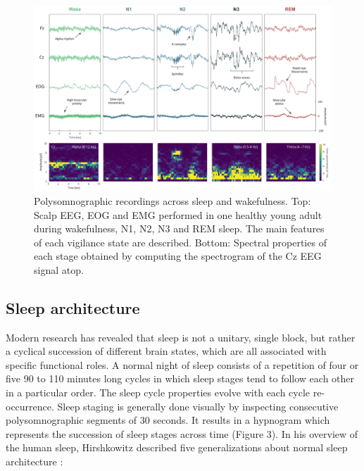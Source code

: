 \begin{figure}
	\centering
	\includegraphics[width=\linewidth, height=0.8\textheight, keepaspectratio]{Fig/Intro/Intro_Sleep_Stages_PSD/Fig_Intro_Sleep_Stages_PSD_final_150517.png}
	\captionsetup{width=0.9\textheight}
	\caption[Polysomnographic recordings across sleep and wakefulness]{Polysomnographic recordings across sleep and wakefulness. Top: Scalp EEG, EOG and EMG performed in one healthy young adult during wakefulness, N1, N2, N3 and REM sleep. The main features of each vigilance state are described. Bottom: Spectral properties of each stage obtained by computing the spectrogram of the Cz EEG signal atop.}
	\label{fig:intro:sleep_stage}
\end{figure}

\subsection{Sleep architecture}
\label{sec:dream-research:sleep:architecture}

Modern research has revealed that sleep is not a unitary, single block, but rather a cyclical succession of different brain states, which are all associated with specific functional roles. A normal night of sleep consists of a repetition of four or five 90 to 110 minutes long cycles in which sleep stages tend to follow each other in a particular order. The sleep cycle properties evolve with each cycle re-occurrence. Sleep staging is generally done visually by inspecting consecutive polysomnographic segments of 30 seconds. It results in a hypnogram which represents the succession of sleep stages across time (Figure 3). In his overview of the human sleep, Hirshkowitz described five generalizations about normal sleep architecture \citep{hirshkowitz_normal_2004}:

